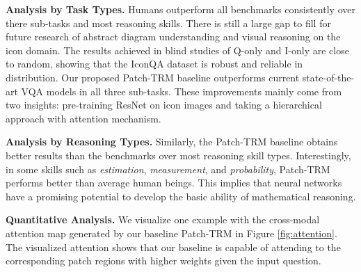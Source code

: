 \documentclass{article}
\begin{document}
\textbf{Analysis by Task Types.} Humans outperform all benchmarks consistently over there sub-tasks and most reasoning skills. There is still a large gap to fill for future research of abstract diagram understanding and visual reasoning on the icon domain. The results achieved in blind studies of Q-only and I-only are close to random, showing that the IconQA dataset is robust and reliable in distribution. Our proposed Patch-TRM baseline outperforms current state-of-the-art VQA models in all three sub-tasks. These improvements mainly come from two insights: pre-training ResNet on icon images and taking a hierarchical approach with attention mechanism.







\textbf{Analysis by Reasoning Types.} Similarly, the Patch-TRM baseline obtains better results than the benchmarks over most reasoning skill types. Interestingly, in some skills such as \textit{estimation}, \textit{measurement}, and \textit{probability}, Patch-TRM performs better than average human beings. This implies that neural networks have a promising potential to develop the basic ability of mathematical reasoning.

\textbf{Quantitative Analysis.} We visualize one example with the cross-modal attention map generated by our baseline Patch-TRM in Figure \ref{fig:attention}. The visualized attention shows that our baseline is capable of attending to the corresponding patch regions with higher weights given the input question. 
\end{document}
